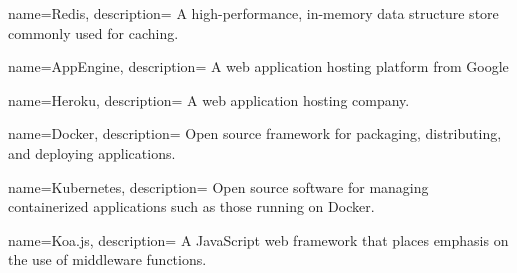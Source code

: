 \documentclass{article}
\begin{document}
{
  name=Redis,
  description={
    A high-performance, in-memory data structure store commonly used for caching. 
  }
}

{
  name=AppEngine,
  description={
    A web application hosting platform from Google
  }
} 

{
  name=Heroku,
  description={
    A web application hosting company.
  }
}


{
  name=Docker,
  description={
    Open source framework for packaging, distributing, and deploying applications.
  }
}

{
  name=Kubernetes,
  description={
    Open source software for managing containerized applications such as those running on Docker.
  }
}

{
  name=Koa.js,
  description={
    A JavaScript web framework that places emphasis on the use of middleware functions.
 } 
}

\glsaddall
\printglossaries
\end{document}
